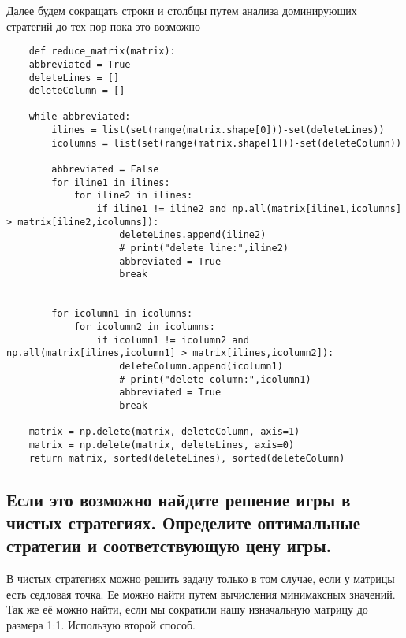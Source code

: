 \documentclass{article}
\begin{document}
Далее будем сокращать строки и столбцы путем анализа доминирующих стратегий до тех пор пока это возможно

\begin{listing}[H]
    \begin{verbatim}
    def reduce_matrix(matrix):
    abbreviated = True
    deleteLines = []
    deleteColumn = []

    while abbreviated:
        ilines = list(set(range(matrix.shape[0]))-set(deleteLines))
        icolumns = list(set(range(matrix.shape[1]))-set(deleteColumn))

        abbreviated = False
        for iline1 in ilines:
            for iline2 in ilines:
                if iline1 != iline2 and np.all(matrix[iline1,icolumns] > matrix[iline2,icolumns]):
                    deleteLines.append(iline2)
                    # print("delete line:",iline2)
                    abbreviated = True
                    break
        

        for icolumn1 in icolumns:
            for icolumn2 in icolumns:
                if icolumn1 != icolumn2 and np.all(matrix[ilines,icolumn1] > matrix[ilines,icolumn2]):
                    deleteColumn.append(icolumn1)
                    # print("delete column:",icolumn1)
                    abbreviated = True
                    break

    matrix = np.delete(matrix, deleteColumn, axis=1)
    matrix = np.delete(matrix, deleteLines, axis=0)
    return matrix, sorted(deleteLines), sorted(deleteColumn)

    \end{verbatim}
\end{listing}

\subsection{Если это возможно найдите решение игры в чистых стратегиях. Определите оптимальные стратегии и соответствующую цену игры.}

В чистых стратегиях можно решить задачу только в том случае, если у матрицы есть седловая точка. Ее можно найти путем вычисления минимаксных значений. Так же её можно найти, если мы сократили нашу изначальную матрицу до размера 1:1. Использую второй способ.
\end{document}
